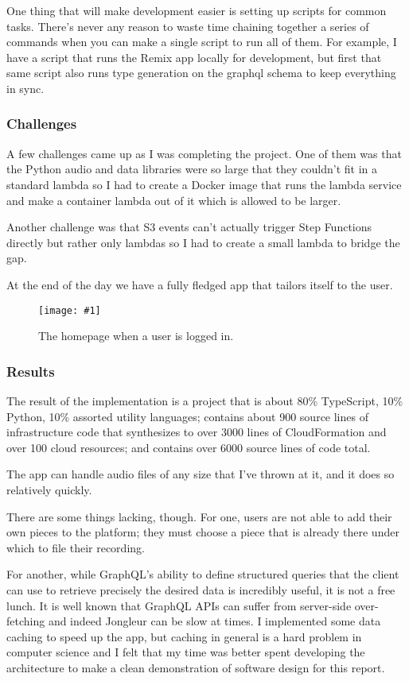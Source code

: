 \documentclass{article}
\newcommand{\screenshot}[2]{
  \begin{figure}[h]
    \texttt{[image: \#1]}
    \caption*{#2}
  \end{figure}
}
\begin{document}
One thing that will make development easier is setting up scripts for common tasks.
There's never any reason to waste time chaining together a series of commands when you can make a single script to run all of them.
For example, I have a script that runs the Remix app locally for development, but first that same script also runs type generation on the graphql schema to keep everything in sync.

\subsubsection{Challenges}

A few challenges came up as I was completing the project.
One of them was that the Python audio and data libraries were so large that they couldn't fit in a standard lambda so I had to create a Docker image that runs the lambda service and make a container lambda out of it which is allowed to be larger.

Another challenge was that S3 events can't actually trigger Step Functions directly but rather only lambdas so I had to create a small lambda to bridge the gap.

At the end of the day we have a fully fledged app that tailors itself to the user.

\screenshot{jong-home-in}{The homepage when a user is logged in.}

\subsubsection{Results}

The result of the implementation is a project that is about 80\% TypeScript, 10\% Python, 10\% assorted utility languages; contains about 900 source lines of infrastructure code that synthesizes to over 3000 lines of CloudFormation and over 100 cloud resources; and contains over 6000 source lines of code total.

The app can handle audio files of any size that I've thrown at it, and it does so relatively quickly.

There are some things lacking, though.
For one, users are not able to add their own pieces to the platform; they must choose a piece that is already there under which to file their recording.

For another, while GraphQL's ability to define structured queries that the client can use to retrieve precisely the desired data is incredibly useful, it is not a free lunch.
It is well known that GraphQL APIs can suffer from server-side over-fetching and indeed Jongleur can be slow at times.
I implemented some data caching to speed up the app, but caching in general is a hard problem in computer science and I felt that my time was better spent developing the architecture to make a clean demonstration of software design for this report.
\end{document}
